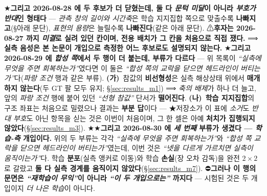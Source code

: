 \documentclass[11pt]{report}
\numberwithin{equation}{chapter}
\numberwithin{figure}{chapter}
\numberwithin{table}{chapter}
\begin{document}
★\textbf{그리고 2026-08-28 에 두 후보가 더 닫혔는데, 둘 다 \emph{문턱 미달}이 아니라
\emph{부호가 반대}인 형태다} --- \emph{관측 창의 길이와 시간축}은 학습 지지집합 쪽으로
맞출수록 \textbf{나빠지고}(\S 아래 문단), \emph{표현의 용량}은 늘릴수록
\textbf{나빠진다}(같은 아래 문단). ⚠\textbf{후자는 2026-08-27 까지 \emph{미결}로
실려 있던 칸이며, 전용 배치가 그 칸을 처음으로 직접 쟀다.}
⟹ \textbf{실측 음성은 본 논문이 개입으로 측정한 어느 후보로도 설명되지 않는다.}
★\textbf{그리고 2026-08-29 에 \emph{합성 쪽}에서 두 행이 더 붙는데, 부류가 다르다} ---
위 목록이 \emph{``실측에 무엇을 주면 회복하는가''}였다면 이 둘은 \emph{``합성 쪽의 교락을
닫으면 헤드라인이 버티는가''}다(\emph{파랑 조건} 행과 같은 부류). \textbf{(가)}~참값의
\textbf{비선형성}은 실측 해상상태 위에서 \textbf{매개하지 않는다}(두 GT 팔 모두 유지;
\S\ref{sec:results_m1}) ⟹ \emph{축의 배제}가 하나 더 늘고, 앞의 \emph{파랑 조건} 행에
붙어 있던 \emph{``선형 참값''} 단서가 \textbf{떨어진다}. \textbf{(나)}~\textbf{학습
지지집합}의 구조 좌표는 처음으로 밀렸으나 결과는 \textbf{부분 답}이다 --- ★저장소가 이 표에
\emph{소거}도 \emph{반대 부호}도 아닌 항목을 싣는 것은 이번이 처음이며, 그 한 셀은 아예
\textbf{처치가 집행되지 않았다}(\S\ref{sec:results_m3}).
★★\textbf{그리고 2026-08-30 에 \emph{세 번째} 부류가 생겼다 --- \emph{학습-측} 개입이다.}
위의 두 부류는 각각 \emph{``실측에 무엇을 주면 회복하는가''}와 \emph{``합성 쪽 교락을 닫으면
헤드라인이 버티는가''}였는데, 이번 것은 \emph{``넷을 다르게 가르치면 실측이 움직이는가''}다.
학습 \textbf{분포}(실측 앵커로 이동)와 학습 \textbf{손실}(장 오차 감독)을 완전 $2\times2$ 로
갈랐고 \textbf{둘 다 실측 경계를 움직이지 않았다}(\S\ref{sec:results_m7}).
⛔\textbf{그러나 이 행의 문면은 \emph{``재학습이 무익''}이 아니라 \emph{``이 두 개입으로는''}
까지다} --- 시험된 것은 두 개입이지 \emph{더 나은 학습}이 아니다.
\end{document}
